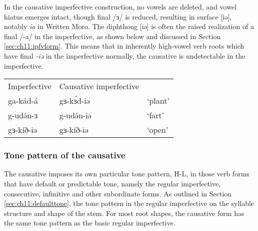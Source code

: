 
In the causative imperfective construction, no vowels are deleted, and vowel hiatus emerges intact, though final /ɜ/ is reduced, resulting in surface [iə], notably \textit{ia} in Written Moro. The diphthong [iə] is often the raised realization of a final /-a/ in the imperfective, as shown below and discussed in Section \ref{sec:ch11:ipfvform}. This means that in inherently high-vowel verb roots which have final \textit{-iə} in the imperfective normally, the causative is undetectable in the imperfective.

\ea
\begin{tabular}[t]{lll}
  Imperfective	&	Causative imperfective			 \\
ga-kád-á		&	gɜ-kɜ́d-iə				&	‘plant’\\ 
g-udə́n-ɜ			&	g-udə́n-iə				&	‘fart’\\
gɜ-kíð-iə		&	gɜ-kíð-iə				&	‘open’\\
\end{tabular}
\z 

\subsubsection{Tone pattern of the causative}\label{sec:ch11:caustone}

The causative imposes its own particular tone pattern, H-L, in those verb forms that have default or predictable tone, namely the regular imperfective, consecutive, infinitive and other subordinate forms. As outlined in Section \ref{sec:ch11:defaulttone}, the tone pattern in the regular imperfective on the syllable structure and shape of the stem. For most root shapes, the causative form has the same tone pattern as the basic regular imperfective.

